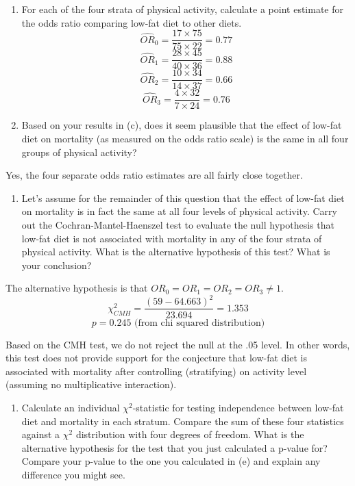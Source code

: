 \documentclass[]{article}
\providecommand{\tightlist}{%
  \setlength{\itemsep}{0pt}\setlength{\parskip}{0pt}}
\begin{document}
\begin{enumerate}
\def\labelenumi{(\alph{enumi})}
\setcounter{enumi}{2}
\item
  For each of the four strata of physical activity, calculate a point
  estimate for the odds ratio comparing low-fat diet to other diets.
  \[\widehat{OR}_0  = \frac{17 \times 75}{75 \times 22} = 0.77\]
  \[\widehat{OR}_1  = \frac{28 \times 45}{40 \times 36} = 0.88\]
  \[\widehat{OR}_2  = \frac{10 \times 34}{14 \times 37} = 0.66\]
  \[\widehat{OR}_3  = \frac{4 \times 32}{7 \times 24} = 0.76\]
\item
  Based on your results in (c), does it seem plausible that the effect
  of low-fat diet on mortality (as measured on the odds ratio scale) is
  the same in all four groups of physical activity?
\end{enumerate}

Yes, the four separate odds ratio estimates are all fairly close
together.

\begin{enumerate}
\def\labelenumi{(\alph{enumi})}
\setcounter{enumi}{4}
\tightlist
\item
  Let's assume for the remainder of this question that the effect of
  low-fat diet on mortality is in fact the same at all four levels of
  physical activity. Carry out the Cochran-Mantel-Haenszel test to
  evaluate the null hypothesis that low-fat diet is not associated with
  mortality in any of the four strata of physical activity. What is the
  alternative hypothesis of this test? What is your conclusion?
\end{enumerate}

The alternative hypothesis is that \(OR_0 = OR_1 = OR_2 = OR_3 \neq 1\).
\[\chi^2_{CMH} = \frac{(59 - 64.663)^2}{23.694} = 1.353\]
\[p = 0.245 \text{ (from chi squared distribution)}\]

Based on the CMH test, we do not reject the null at the .05 level. In
other words, this test does not provide support for the conjecture that
low-fat diet is associated with mortality after controlling
(stratifying) on activity level (assuming no multiplicative
interaction).

\begin{enumerate}
\def\labelenumi{(\alph{enumi})}
\setcounter{enumi}{5}
\tightlist
\item
  Calculate an individual \(\chi^2\)-statistic for testing independence
  between low-fat diet and mortality in each stratum. Compare the sum of
  these four statistics against a \(\chi^2\) distribution with four
  degrees of freedom. What is the alternative hypothesis for the test
  that you just calculated a p-value for? Compare your p-value to the
  one you calculated in (e) and explain any difference you might see.
\end{enumerate}
\end{document}
